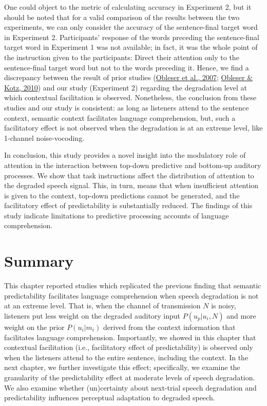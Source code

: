 \documentclass[a4paper, nobind]{templates/ociamthesis}
\begin{document}
One could object to the metric of calculating accuracy in Experiment 2,
but it should be noted that for a valid comparison of the results between the two experiments,
we can only consider the accuracy of the sentence-final target word in Experiment 2.
Participants' response of the words preceding the sentence-final target word in Experiment 1 was not available;
in fact, it was the whole point of the instruction given to the participants:
Direct their attention only to the sentence-final target word but not to the words preceding it.
Hence, we find a discrepancy between the result of prior studies (\protect\hyperlink{ref-Obleser2007}{Obleser et al., 2007}; \protect\hyperlink{ref-Obleser2010}{Obleser \& Kotz, 2010}) and our study (Experiment 2)
regarding the degradation level at which contextual facilitation is observed.
Nonetheless, the conclusion from these studies and our study is consistent:
as long as listeners attend to the sentence context, semantic context facilitates language comprehension,
but, such a facilitatory effect is not observed when the degradation is at an extreme level, like 1-channel noise-vocoding.

In conclusion, this study provides a novel insight into the modulatory role of attention in the interaction between top-down predictive and bottom-up auditory processes.
We show that task instructions affect the distribution of attention to the degraded speech signal.
This, in turn, means that when insufficient attention is given to the context, top-down predictions cannot be generated, and the facilitatory effect of predictability is substantially reduced.
The findings of this study indicate limitations to predictive processing accounts of language comprehension.

\hypertarget{summary-2}{%
\section{Summary}\label{summary-2}}

This chapter reported studies which replicated the previous finding that semantic predictability facilitates language comprehension
when speech degradation is not at an extreme level.
That is, when the channel of transmission \(N\) is noisy,
listeners put less weight on the degraded auditory input \(P(u_p|u_i,N)\) and
more weight on the prior \(P(u_i|m_i)\) derived from the context information that facilitates language comprehension.
Importantly,
we showed in this chapter that contextual facilitation (i.e., facilitatory effect of predictability) is observed only when the listeners attend to the entire sentence, including the context.
In the next chapter, we further investigate this effect;
specifically, we examine the granularity of the predictability effect at moderate levels of speech degradation.
We also examine whether (un)certainty about next-trial speech degradation and predictability influences perceptual adaptation to degraded speech.
\end{document}
